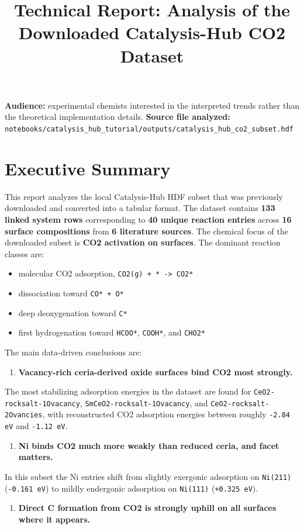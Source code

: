 \documentclass[11pt]{article}
\begin{document}
\title{Technical Report: Analysis of the Downloaded Catalysis-Hub CO2 Dataset}
\maketitle
\textbf{Audience:} experimental chemists interested in the interpreted trends rather than the theoretical implementation details.
\textbf{Source file analyzed:} \texttt{notebooks/catalysis\_hub\_tutorial/outputs/catalysis\_hub\_co2\_subset.hdf}
\section{Executive Summary}
This report analyzes the local Catalysis-Hub HDF subset that was previously downloaded and converted into a tabular format. The dataset contains \textbf{133 linked system rows} corresponding to \textbf{40 unique reaction entries} across \textbf{16 surface compositions} from \textbf{6 literature sources}.
The chemical focus of the downloaded subset is \textbf{CO2 activation on surfaces}. The dominant reaction classes are:
\begin{itemize}
\item molecular CO2 adsorption, \texttt{CO2(g) + * -> CO2*}
\item dissociation toward \texttt{CO* + O*}
\item deep deoxygenation toward \texttt{C*}
\item first hydrogenation toward \texttt{HCOO*}, \texttt{COOH*}, and \texttt{CHO2*}
\end{itemize}
The main data-driven conclusions are:
\begin{enumerate}
\item \textbf{Vacancy-rich ceria-derived oxide surfaces bind CO2 most strongly.}
\end{enumerate}
The most stabilizing adsorption energies in the dataset are found for \texttt{CeO2-rocksalt-1Ovacancy}, \texttt{SmCeO2-rocksalt-1Ovacancy}, and \texttt{CeO2-rocksalt-2Ovancies}, with reconstructed CO2 adsorption energies between roughly \texttt{-2.84 eV} and \texttt{-1.12 eV}.
\begin{enumerate}
\item \textbf{Ni binds CO2 much more weakly than reduced ceria, and facet matters.}
\end{enumerate}
In this subset the Ni entries shift from slightly exergonic adsorption on \texttt{Ni(211)} (\texttt{-0.161 eV}) to mildly endergonic adsorption on \texttt{Ni(111)} (\texttt{+0.325 eV}).
\begin{enumerate}
\item \textbf{Direct C formation from CO2 is strongly uphill on all surfaces where it appears.}
\end{enumerate}
\end{document}
